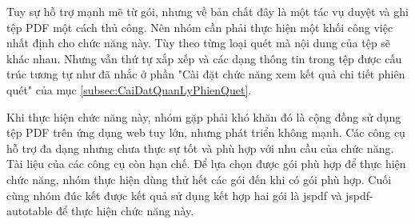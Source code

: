 Tuy sự hỗ trợ mạnh mẽ từ gói, nhưng về bản chất đây là một tác vụ duyệt và ghi tệp PDF một cách thủ công.
Nên nhóm cần phải thực hiện một khối công việc nhất định cho chức năng này.
Tùy theo từng loại quét mà nội dung của tệp sẽ khác nhau.
Nhưng vẫn thứ tự xắp xếp và các dạng thông tin trong tệp được cấu trúc tương tự như đã nhắc ở phần "Cài đặt chức năng xem kết quả chi tiết phiên quét" của mục \ref{subsec:CaiDatQuanLyPhienQuet}.

Khi thực hiện chức năng này, nhóm gặp phải khó khăn đó là cộng đồng sử dụng tệp PDF trên ứng dụng web tuy lớn, nhưng phát triển không mạnh. Các công cụ hỗ trợ đa dạng nhưng chưa thực sự tốt và phù hợp với nhu cầu của chức năng. Tài liệu của các công cụ còn hạn chế. Để lựa chọn được gói phù hợp để thực hiện chức năng, nhóm thực hiện dùng thử hết các gói đến khi có gói phù hợp. Cuối cùng nhóm đúc kết được kết quả sử dụng kết hợp hai gói là jspdf và jspdf-autotable để thực hiện chức năng này.